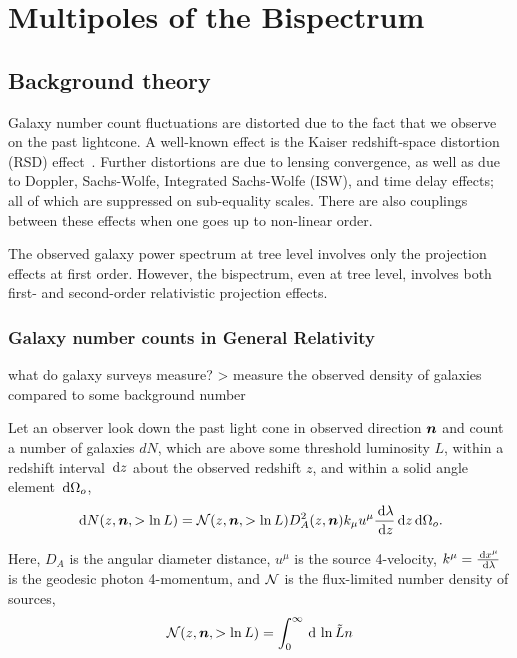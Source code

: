 \chapter{Multipoles of the Bispectrum}
\label{chapter:multipoles}



\section{Background theory}

Galaxy number count fluctuations are distorted due to the fact that we observe on the past lightcone. A well-known effect is the Kaiser redshift-space distortion (RSD) effect~\citep{Verde:1998zr,Scoccimarro:1999ed}. Further distortions are due to lensing convergence, as well as due to Doppler, Sachs-Wolfe, Integrated Sachs-Wolfe (ISW), and time delay effects; all of which are suppressed on sub-equality scales. There are also couplings between these effects when one goes up to non-linear order. 

The observed galaxy power spectrum at tree level involves only the projection effects at first order. However, the bispectrum, even at tree level, involves both first- and second-order relativistic projection effects. 


\subsection{Galaxy number counts in General Relativity}

what do galaxy surveys measure? > measure the observed density of galaxies compared to some background number


Let an observer look down the past light cone in observed direction $\bm {n}$ and count a number of galaxies $dN$, which are above some threshold luminosity $L$, within a redshift interval $\,\mathrm{d} z$ about the observed redshift $z$, and within a solid angle element $\,\mathrm{d} \Omega_o$, 
\begin{equation}	
	\,\mathrm{d} N(z, \bm {n}, > \ln L) = \mathcal{N}(z, \bm {n}, >\ln L) D_A^2(z,\bm {n}) k_\mu u^\mu \frac{\,\mathrm{d} \lambda}{\,\mathrm{d} z} \,\mathrm{d} z \,\mathrm{d} \Omega_o.
\end{equation}	

Here, $D_A$ is the angular diameter distance, $u^\mu$ is the source 4-velocity, $k^\mu = \frac{\,\mathrm{d} x^\mu}{\,\mathrm{d} \lambda}$ is the geodesic photon 4-momentum, and $\mathcal{N}$ is the flux-limited number density of sources,
\begin{equation}
	\mathcal{N}(z,\bm {n},>\ln L) = \int_0^\infty \,\mathrm{d}\,\ln \tilde{L} n
\end{equation}

